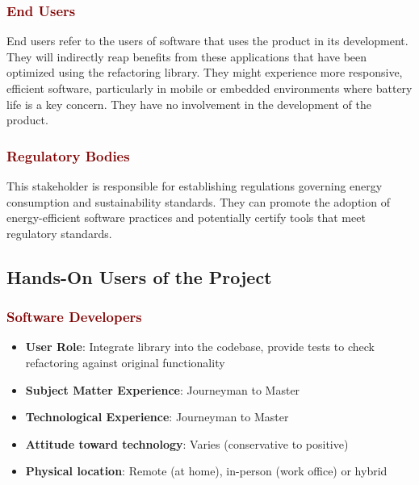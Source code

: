 \documentclass[12pt]{article}
\begin{document}
\subsubsection*{\textcolor{Maroon}{End Users}}
End users refer to the users of software that uses the product in its development. They will indirectly reap benefits from these applications that have been optimized using the refactoring library. They might experience more responsive, efficient software, particularly in mobile or embedded environments where battery life is a key concern. They have no involvement in the development of the product. 

\subsubsection*{\textcolor{Maroon}{Regulatory Bodies}}
This stakeholder is responsible for establishing regulations governing energy consumption and sustainability standards. They can promote the adoption of energy-efficient software practices and potentially certify tools that meet regulatory standards. 

\subsection{Hands-On Users of the Project}
\subsubsection*{\textcolor{Maroon}{Software Developers}}
\begin{itemize}
  \item \textbf{User Role}: Integrate library into the codebase, provide tests to check refactoring against original functionality

  \item \textbf{Subject Matter Experience}: Journeyman to Master
  
  \item \textbf{Technological Experience}: Journeyman to Master
  
  \item \textbf{Attitude toward technology}: Varies (conservative to positive)
  
  \item \textbf{Physical location}: Remote (at home), in-person (work office) or hybrid
\end{itemize}
\end{document}
